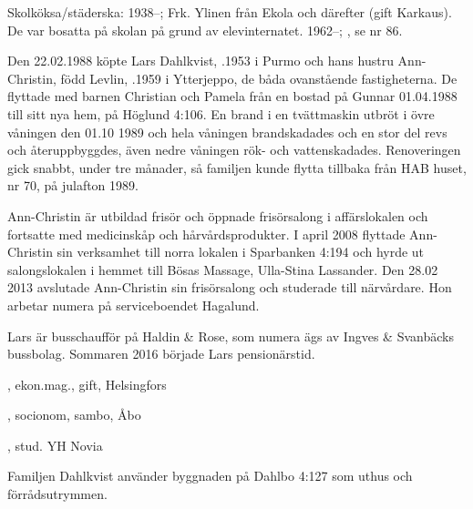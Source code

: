 Skolköksa/städerska:
1938--;	Frk. Ylinen från Ekola och därefter  (gift Karkaus). De var bosatta på skolan på grund av elevinternatet.
1962--;	, se nr 86.






Den 22.02.1988 köpte Lars Dahlkvist, .1953 i Purmo och	hans hustru Ann-Christin, född Levlin, .1959 i Ytterjeppo, de båda ovanstående fastigheterna. De flyttade med barnen Christian och Pamela från en bostad på Gunnar 01.04.1988 till sitt nya hem, på Höglund	4:106. En brand i en tvättmaskin utbröt i övre våningen den 01.10 1989 	och hela våningen brandskadades och en stor del revs och 	återuppbyggdes, även nedre våningen rök- och vattenskadades. 	Renoveringen gick snabbt, under tre månader, så familjen kunde flytta tillbaka från HAB huset, nr 70, på	julafton 1989.

Ann-Christin är utbildad frisör och öppnade frisörsalong i affärslokalen och fortsatte med medicinskåp och hårvårdsprodukter. I april 2008 flyttade Ann-Christin sin verksamhet till norra lokalen i Sparbanken 4:194 och hyrde ut	salongslokalen i hemmet till Bösas Massage, Ulla-Stina Lassander. Den 28.02 2013 avslutade Ann-Christin sin frisörsalong och studerade till närvårdare. Hon arbetar numera på serviceboendet Hagalund.

Lars är busschaufför på Haldin \& Rose, som numera ägs av Ingves \& Svanbäcks bussbolag. Sommaren 2016 började Lars pensionärstid.
\begin{jhchildren}
  \item {}, ekon.mag., gift, Helsingfors
  \item {}, socionom, sambo, Åbo
  \item {}, stud. YH Novia
\end{jhchildren}
Familjen Dahlkvist använder byggnaden på Dahlbo 4:127 som	uthus och förrådsutrymmen.


